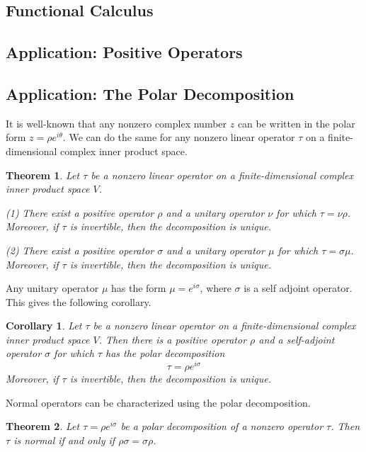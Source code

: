 \documentclass{book}
\newtheorem{theorem}{Theorem}[section]
\newtheorem{corollary}{Corollary}[theorem]
\theoremstyle{definition}
\begin{document}
\subsection{Functional Calculus}


\subsection{Application: Positive Operators}



\subsection{Application: The Polar Decomposition}
It is well-known that any nonzero complex number $z$ can be written in the polar form $z=\rho e^{i\theta}$. We can do the same for any nonzero linear operator $\tau$ on a finite-dimensional complex inner product space.
\begin{theorem}
Let $\tau$ be a nonzero linear operator on a finite-dimensional complex inner product space $V$.\par
(1) There exist a positive operator $\rho$ and a unitary operator $\nu$ for which $\tau=\nu\rho$. Moreover, if $\tau$ is invertible, then the decomposition is unique.\par
(2) There exist a positive operator $\sigma$ and a unitary operator $\mu$ for which $\tau=\sigma\mu$. Moreover, if $\tau$ is invertible, then the decomposition is unique.
\end{theorem}
Any unitary operator $\mu$ has the form $\mu=e^{i\sigma}$, where $\sigma$ is a self adjoint operator. This gives the following corollary.
\begin{corollary}
Let $\tau$ be a nonzero linear operator on a finite-dimensional complex inner product space $V$. Then there is a positive operator $\rho$ and a self-adjoint operator $\sigma$ for which $\tau$ has the polar decomposition \[\tau=\rho e^{i\sigma}\]
Moreover, if $\tau$ is invertible, then the decomposition is unique.
\end{corollary}
Normal operators can be characterized using the polar decomposition.
\begin{theorem}
Let $\tau=\rho e^{i\sigma}$ be a polar decomposition of a nonzero operator $\tau$. Then $\tau$ is normal if and only if $\rho\sigma=\sigma\rho$.
\end{theorem}
\end{document}
